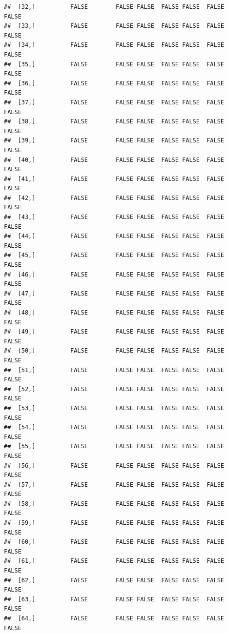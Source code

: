\documentclass[
  english,
  man,floatsintext]{apa6}
\begin{document}
\begin{verbatim}
##  [32,]          FALSE        FALSE FALSE  FALSE FALSE  FALSE            FALSE
##  [33,]          FALSE        FALSE FALSE  FALSE FALSE  FALSE            FALSE
##  [34,]          FALSE        FALSE FALSE  FALSE FALSE  FALSE            FALSE
##  [35,]          FALSE        FALSE FALSE  FALSE FALSE  FALSE            FALSE
##  [36,]          FALSE        FALSE FALSE  FALSE FALSE  FALSE            FALSE
##  [37,]          FALSE        FALSE FALSE  FALSE FALSE  FALSE            FALSE
##  [38,]          FALSE        FALSE FALSE  FALSE FALSE  FALSE            FALSE
##  [39,]          FALSE        FALSE FALSE  FALSE FALSE  FALSE            FALSE
##  [40,]          FALSE        FALSE FALSE  FALSE FALSE  FALSE            FALSE
##  [41,]          FALSE        FALSE FALSE  FALSE FALSE  FALSE            FALSE
##  [42,]          FALSE        FALSE FALSE  FALSE FALSE  FALSE            FALSE
##  [43,]          FALSE        FALSE FALSE  FALSE FALSE  FALSE            FALSE
##  [44,]          FALSE        FALSE FALSE  FALSE FALSE  FALSE            FALSE
##  [45,]          FALSE        FALSE FALSE  FALSE FALSE  FALSE            FALSE
##  [46,]          FALSE        FALSE FALSE  FALSE FALSE  FALSE            FALSE
##  [47,]          FALSE        FALSE FALSE  FALSE FALSE  FALSE            FALSE
##  [48,]          FALSE        FALSE FALSE  FALSE FALSE  FALSE            FALSE
##  [49,]          FALSE        FALSE FALSE  FALSE FALSE  FALSE            FALSE
##  [50,]          FALSE        FALSE FALSE  FALSE FALSE  FALSE            FALSE
##  [51,]          FALSE        FALSE FALSE  FALSE FALSE  FALSE            FALSE
##  [52,]          FALSE        FALSE FALSE  FALSE FALSE  FALSE            FALSE
##  [53,]          FALSE        FALSE FALSE  FALSE FALSE  FALSE            FALSE
##  [54,]          FALSE        FALSE FALSE  FALSE FALSE  FALSE            FALSE
##  [55,]          FALSE        FALSE FALSE  FALSE FALSE  FALSE            FALSE
##  [56,]          FALSE        FALSE FALSE  FALSE FALSE  FALSE            FALSE
##  [57,]          FALSE        FALSE FALSE  FALSE FALSE  FALSE            FALSE
##  [58,]          FALSE        FALSE FALSE  FALSE FALSE  FALSE            FALSE
##  [59,]          FALSE        FALSE FALSE  FALSE FALSE  FALSE            FALSE
##  [60,]          FALSE        FALSE FALSE  FALSE FALSE  FALSE            FALSE
##  [61,]          FALSE        FALSE FALSE  FALSE FALSE  FALSE            FALSE
##  [62,]          FALSE        FALSE FALSE  FALSE FALSE  FALSE            FALSE
##  [63,]          FALSE        FALSE FALSE  FALSE FALSE  FALSE            FALSE
##  [64,]          FALSE        FALSE FALSE  FALSE FALSE  FALSE            FALSE

\end{verbatim}
\end{document}

